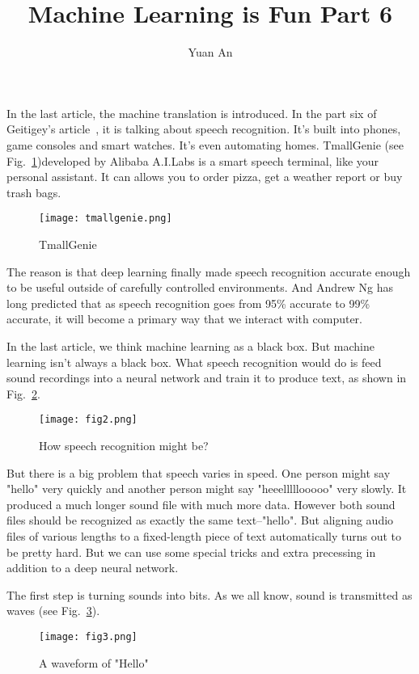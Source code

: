 \documentclass[10pt,twocolumn,letterpaper]{article}
\begin{document}
	\title{Machine Learning is Fun Part 6}	
	\author{Yuan An}
	\maketitle
	In the last article, the machine translation is introduced. In the part six of Geitigey's article~\cite{MLisFun}, it is talking about speech recognition. It's built into phones, game consoles and smart watches. It's even automating homes. \Eg TmallGenie (see Fig.~\ref{fig1})developed by Alibaba A.I.Labs is a smart speech terminal, like your personal assistant. It can allows you to order pizza, get a weather report or buy trash bags.
	\begin{figure}[h]
		\centering
		\texttt{[image: tmallgenie.png]}
		\caption{TmallGenie} \label{fig1}
	\end{figure}
	\par
	The reason is that deep learning finally made speech recognition accurate enough to be useful outside of carefully controlled environments. And Andrew Ng has long predicted that as speech recognition goes from 95\% accurate to 99\% accurate, it will become a primary way that we interact with computer.
	\par
	In the last article, we think machine learning as a black box. But machine learning isn't always a black box. What speech recognition would do is feed sound recordings into a neural network and train it to produce text, as shown in Fig.~\ref{fig2}.
	\begin{figure}[h]
		\centering
		\texttt{[image: fig2.png]}
		\caption{How speech recognition might be?} \label{fig2}
	\end{figure}
	\par
	But there is a big problem that speech varies in speed. One person might say "hello" very quickly and another person might say "heeelllllooooo" very slowly. It produced a much longer sound file with much more data. However both sound files should be recognized as exactly the same text--"hello". But aligning audio files of various lengths to a fixed-length piece of text automatically turns out to be pretty hard. But we can use some special tricks and extra precessing in addition to a deep neural network.
	\par
	The first step is turning sounds into bits. As we all know, sound is transmitted as waves (see Fig.~\ref{fig3}).
	\begin{figure}[h]
		\centering
		\texttt{[image: fig3.png]}
		\caption{A waveform of "Hello"} \label{fig3}
	\end{figure}
\end{document}
